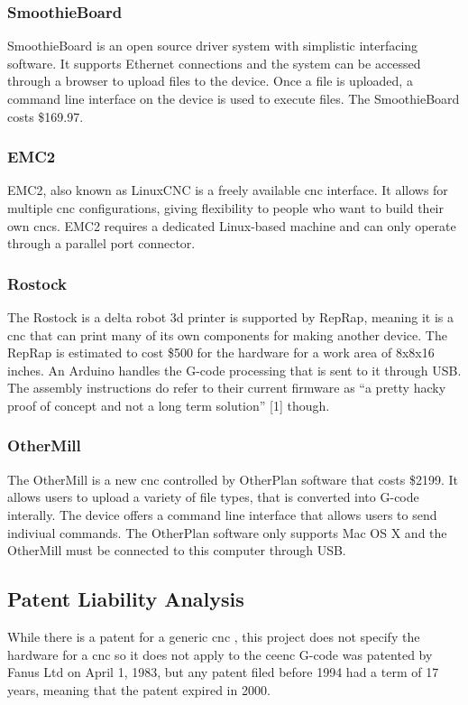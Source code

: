 \subsubsection{SmoothieBoard}
SmoothieBoard is an open source driver system with simplistic interfacing software.
It supports Ethernet connections and the system can be accessed through a browser to upload files to the device.
Once a file is uploaded, a command line interface on the device is used to execute files.
The SmoothieBoard costs \$169.97.

\subsubsection{EMC2}
EMC2, also known as LinuxCNC is a freely available \gls{cnc} interface.
It allows for multiple \gls{cnc} configurations, giving flexibility to people who want to build their own \gls{cnc}s.
EMC2 requires a dedicated Linux-based machine and can only operate through a parallel port connector.

\subsubsection{Rostock}
The Rostock is a delta robot \gls{3d} printer is supported by RepRap, meaning it is a \gls{cnc} that can print many of its own components for making another device. 
The RepRap is estimated to cost \$500 for the hardware for a work area of 8x8x16 inches.
An Arduino handles the G-code processing that is sent to it through USB.
The assembly instructions do refer to their current firmware as “a pretty hacky proof of concept and not a long term solution” [1] though.

\subsubsection{OtherMill}
The OtherMill is a new \gls{cnc} controlled by OtherPlan software that costs \$2199.
It allows users to upload a variety of file types, that is converted into G-code interally.
The device offers a command line interface that allows users to send indiviual commands.
The OtherPlan software only supports Mac OS X and the OtherMill must be connected to this computer through USB.

\subsection{Patent Liability Analysis}
While there is a patent for a generic \gls{cnc}  \cite{3cncpatent}
, this project does not specify the hardware for a \gls{cnc} so it does not apply to the \gls{ceenc}
G-code was patented by Fanus Ltd  \cite{controlmethodpatent} on April 1, 1983, but any patent filed before 1994 had a term of 17 years, meaning that the patent expired in 2000.

